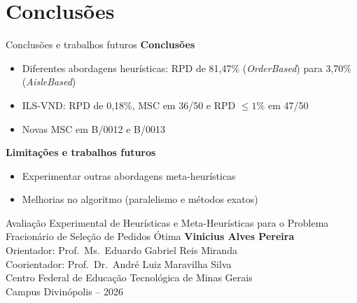 \documentclass{beamer}
\begin{document}
\section{Conclusões}

\begin{frame}{Conclusões e trabalhos futuros}
    \small
    \textbf{Conclusões}
    \begin{itemize}
        \item Diferentes abordagens heurísticas: RPD de 81,47\% (\textit{OrderBased}) para 3,70\% (\textit{AisleBased})
        \item ILS-VND: RPD de 0,18\%, MSC em 36/50 e RPD $\le 1\%$ em 47/50
        \item Novas MSC em B/0012 e B/0013
    \end{itemize}

    \medskip
    \textbf{Limitações e trabalhos futuros}
    \begin{itemize}
        \item Experimentar outras abordagens meta-heurísticas
        \item Melhorias no algoritmo (paralelismo e métodos exatos)
    \end{itemize}
\end{frame}

\begin{frame}[plain]
    \begin{center}
        \vfill
        Avaliação Experimental de Heurísticas e Meta-Heurísticas para o Problema Fracionário de Seleção de Pedidos Ótima
        \vfill
        \normalsize
        \textbf{Vinicius Alves Pereira} \\[0.3cm]
        \small
        Orientador: Prof.\ Ms.\ Eduardo Gabriel Reis Miranda \\
        Coorientador: Prof.\ Dr.\ André Luiz Maravilha Silva \\[0.5cm]
        Centro Federal de Educação Tecnológica de Minas Gerais \\
        Campus Divinópolis -- 2026
        \vfill
    \end{center}
\end{frame}
\end{document}
